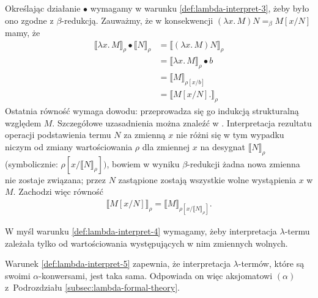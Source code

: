 Określając działanie \(\bullet\) wymagamy w warunku \ref{def:lambda-interpret-3}, żeby było ono zgodne z \(\beta\)-redukcją. Zauważmy, że w konsekwencji \((\lambda x.\,M) N =_\beta M[x/N]\) mamy, że
\begin{align*}
  \llbracket \lambda x.\,M \rrbracket_\rho \bullet \llbracket N \rrbracket_\rho 
    &= \llbracket (\lambda x.\,M) N\rrbracket_\rho \\
    &= \llbracket \lambda x.\,M \rrbracket_\rho \bullet b \\
    &= \llbracket M \rrbracket_{\rho[x/b]} \\
    &= \llbracket M[x/N]. \rrbracket_\rho\tag{\dagger}\label{eq:abstraction-to-substitution-in-model}
\end{align*}
Ostatnia równość wymaga dowodu: przeprowadza się go indukcją strukturalną względem \(M\). Szczegółowe uzasadnienia można znaleźć w \cite[Tw. 15.10(a)]{Hindley:2008:LCI:1388400}. Interpretacja rezultatu operacji podstawienia termu \(N\) za zmienną \(x\) nie różni się w tym wypadku niczym od zmiany wartościowania \(\rho\) dla zmiennej \(x\) na desygnat \(\llbracket N\rrbracket_\rho\) (symbolicznie: \(\rho[x/\llbracket N \rrbracket_\rho])\), bowiem w wyniku \(\beta\)-redukcji żadna nowa zmienna nie zostaje związana; przez \(N\) zastąpione zostają wszystkie wolne wystąpienia \(x\) w \(M\). Zachodzi więc równość
\begin{align*}
  \llbracket M[x/N] \rrbracket_\rho = \llbracket M \rrbracket_{\rho[x/\llbracket N \rrbracket_\rho]}.
\end{align*}

W myśl warunku \ref{def:lambda-interpret-4} wymagamy, żeby interpretacja \(\lambda\)-termu zależała tylko od wartościowania występujących w nim zmiennych wolnych. 

Warunek \ref{def:lambda-interpret-5} zapewnia, że interpretacja \(\lambda\)-termów, które są swoimi \(\alpha\)-konwersami, jest taka sama. Odpowiada on więc aksjomatowi \((\alpha)\) z~Podrozdziału \ref{subsec:lambda-formal-theory}.

  
